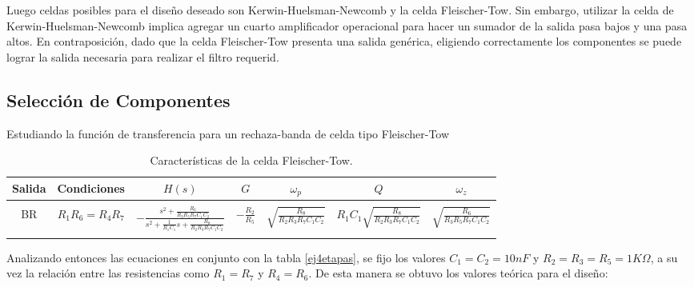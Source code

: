 Luego celdas posibles para el diseño deseado son Kerwin-Huelsman-Newcomb y la celda Fleischer-Tow. Sin embargo, utilizar la celda de Kerwin-Huelsman-Newcomb implica agregar un cuarto amplificador operacional para hacer un sumador de la salida pasa bajos y una pasa altos. En contraposición, dado que la celda Fleischer-Tow presenta una salida genérica, eligiendo correctamente los componentes se puede lograr la salida necesaria para realizar el filtro requerid.

\subsection{Selección de Componentes}

Estudiando la función de transferencia para un rechaza-banda de celda tipo Fleischer-Tow



\begin{table}[H] %
	\centering
	\begin{tabular}{c c c c c c c}
		Salida & Condiciones & $H(s)$ & $G$ & $\omega_p$ & $Q$ & $\omega_z$\\
		\hline \\
		BR &$R_1R_6=R_4R_7$ &\multirow{2}{*}{$- \frac{s^2+\frac{R_6}{R_3R_5R_7C_1C_2}}{s^2+\frac{1}{R_1C_1}s+\frac{R_8}{R_2R_3R_7C_1C_2}}$}&\multirow{2}{*}{$-\frac{R_2}{R_5}$}& \multirow{2}{*}{$\sqrt{\frac{R_8}{R_2R_3R_7C_1C_2}}$}&
		\multirow{2}{*}{$R_1C_1\sqrt{\frac{R_8}{R_2R_3R_7C_1C_2}}$}
		&\multirow{2}{*}{$\sqrt{\frac{R_6}{R_3 R_5 R_7 C_1 C_2}}$}\\ \\ \\
		\hline
	\end{tabular}
	\caption{Caracter\'isticas de la celda Fleischer-Tow.}
	\label{ej4hn}
\end{table}

Analizando entonces las ecuaciones en conjunto con la tabla \ref{ej4etapas}, se fijo los valores $C_1 = C_2 = 10nF$ y $R_2 = R_3 = R_5 = 1K\Omega$, a su vez la relación entre las resistencias como $R_1 = R_7$ y $R_4 = R_6$. De esta manera se obtuvo los valores teórica para el diseño:

